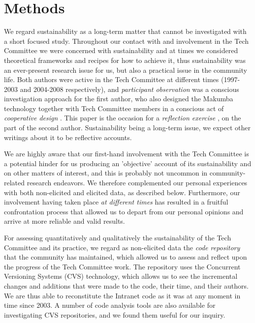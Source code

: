 \documentclass{acm_proc_article-sp}
\begin{document}
\section{Methods}\label{sec:method}
We regard sustainability as a long-term matter that cannot be investigated with a short focused study. Throughout our contact with and involvement in the Tech Committee we were concerned with sustainability and at times we considered  theoretical frameworks and recipes for how to achieve it, thus sustainability was an ever-present research issue for us, but also a practical issue in the community life. Both authors were active in the Tech Committee at different times (1997-2003 and 2004-2008 respectively), and {\it participant observation} was a conscious investigation approach for the first author, who also designed the Makumba technology together with Tech Committee members in a conscious act of {\it cooperative design} \cite{greenbaum_kyng91} . This paper is the occasion for a {\it reflection exercise} \cite{schon83}, on the part of the second author. Sustainability being a long-term issue, we expect other writings about it to be reflective accounts. 

We are highly aware that our first-hand involvement with the Tech Committee is a potential hinder for us producing an 'objective' account of its sustainability and on other matters of interest, and this is probably not uncommon in community-related research endeavors. We therefore complemented our personal experiences with both non-elicited and elicited data, as described below. Furthermore, our involvement having taken place {\it at different times} has resulted in a fruitful confrontation process that allowed us to depart from our personal opinions and arrive at more reliable and valid results.

For assessing quantitatively and qualitatively the sustainability of the Tech Committee and its practice, we regard as non-elicited data the {\it code repository} that the community has maintained, which allowed us to assess and reflect upon the progress of the Tech Committee work. The repository uses the Concurrent Versioning Systems (CVS) technology, which allows us to see the incremental changes and additions that were made to the code, their time, and their authors. We are thus able to reconstitute the Intranet code as it was at any moment in time since 2003. A number of code analysis tools are also available for investigating CVS repositories, and we found them useful for our inquiry.
\end{document}
